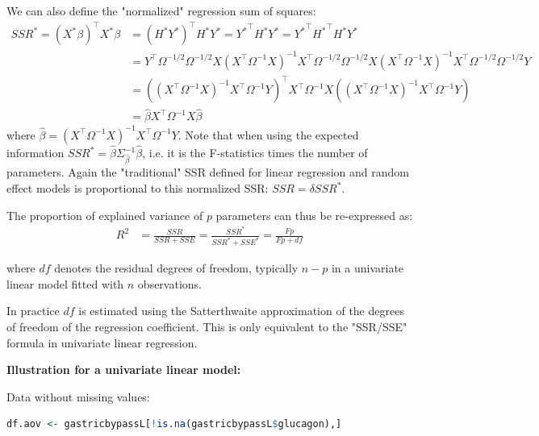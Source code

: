 \documentclass[12pt]{article}
\newcommand\Warning[1][3ex]{%
\renewcommand\stacktype{L}%
\scaleto{\stackon[1.3pt]{\color{red}$\triangle$}{\tiny\bfseries !}}{#1}%
\xspace
}
\newcommand\trans[1]{{#1}^\intercal}%
\begin{document}
\bigskip

We can also define the "normalized" regression sum of squares:
\begin{align*}
SSR^* = \trans{(X^*\beta)}X^*\beta &= \trans{\left(H^* Y^*\right)} H^* Y^* = \trans{Y^*} H^* Y^* = \trans{Y^*} \trans{H^*} H^* Y^* \\
&= \trans{Y} \Omega^{-1/2} \Omega^{-1/2} X (\trans{X}\Omega^{-1}X)^{-1} \trans{X} \Omega^{-1/2} \Omega^{-1/2} X (\trans{X}\Omega^{-1}X)^{-1} \trans{X} \Omega^{-1/2} \Omega^{-1/2} Y \\
&= \trans{\left((\trans{X}\Omega^{-1}X)^{-1} \trans{X} \Omega^{-1} Y\right)} \trans{X} \Omega^{-1} X \left((\trans{X}\Omega^{-1}X)^{-1} \trans{X} \Omega^{-1} Y\right) \\
&= \widehat{\beta} \trans{X} \Omega^{-1} X \widehat{\beta}
\end{align*}
where \(\widehat{\beta}= \left(\trans{X}\Omega^{-1}
X\right)^{-1}\trans{X} \Omega^{-1} Y\). Note that when using the
expected information \(SSR^* = \widehat{\beta}
\Sigma^{-1}_{\widehat{\beta}} \widehat{\beta}\), i.e. it is the
F-statistics times the number of parameters. Again the "traditional"
SSR defined for linear regression and random effect models is
proportional to this normalized SSR: \(SSR=\delta SSR^{*}\).

\bigskip

The proportion of explained variance of \(p\) parameters can thus be
re-expressed as:
\begin{align*}
R^2 &= \frac{SSR}{SSR+SSE} = \frac{SSR^*}{SSR^*+SSE^*}= \frac{Fp}{Fp+df}
\end{align*}

where \(df\) denotes the residual degrees of freedom, typically
\(n-p\) in a univariate linear model fitted with \(n\)
observations. \newline \Warning In practice \(df\) is estimated using the
Satterthwaite approximation of the degrees of freedom of the
regression coefficient. This is only equivalent to the "SSR/SSE"
formula in univariate linear regression.

\bigskip
\bigskip

\textbf{Illustration for a univariate linear model:}

\bigskip

Data without missing values:
\begin{lstlisting}[language=r,numbers=none]
df.aov <- gastricbypassL[!is.na(gastricbypassL$glucagon),]
\end{lstlisting}
\end{document}
